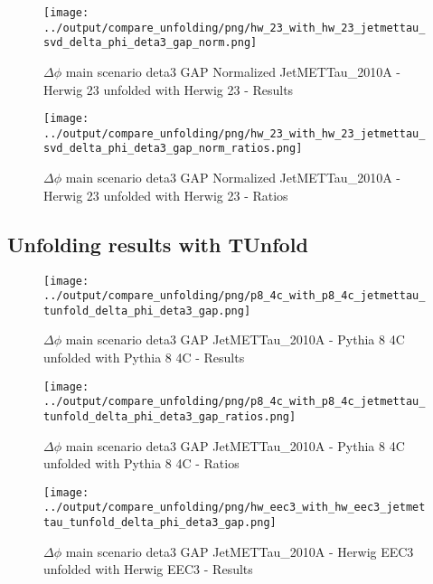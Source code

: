 \documentclass[11pt]{book}
\begin{document}
\begin{figure}[ht]
\centering
\texttt{[image: ../output/compare\_unfolding/png/hw\_23\_with\_hw\_23\_jetmettau\_svd\_delta\_phi\_deta3\_gap\_norm.png]}
\caption{$\Delta\phi$ main scenario deta3 GAP Normalized JetMETTau\_2010A - Herwig 23 unfolded with Herwig 23 - Results}
\label{hw_23_hw_23_jetmettau_svd_delta_phi_deta3_gap_norm_a}
\end{figure}

\begin{figure}[ht]
\centering
\texttt{[image: ../output/compare\_unfolding/png/hw\_23\_with\_hw\_23\_jetmettau\_svd\_delta\_phi\_deta3\_gap\_norm\_ratios.png]}
\caption{$\Delta\phi$ main scenario deta3 GAP Normalized JetMETTau\_2010A - Herwig 23 unfolded with Herwig 23 - Ratios}
\label{hw_23_hw_23_jetmettau_svd_delta_phi_deta3_gap_norm_b}
\end{figure}


\clearpage
\subsection{Unfolding results with TUnfold}

\begin{figure}[ht]
\centering
\texttt{[image: ../output/compare\_unfolding/png/p8\_4c\_with\_p8\_4c\_jetmettau\_tunfold\_delta\_phi\_deta3\_gap.png]}
\caption{$\Delta\phi$ main scenario deta3 GAP JetMETTau\_2010A - Pythia 8 4C unfolded with Pythia 8 4C - Results}
\label{p8_p8_jetmettau_tunfold_delta_phi_deta3_gap_a}
\end{figure}

\begin{figure}[ht]
\centering
\texttt{[image: ../output/compare\_unfolding/png/p8\_4c\_with\_p8\_4c\_jetmettau\_tunfold\_delta\_phi\_deta3\_gap\_ratios.png]}
\caption{$\Delta\phi$ main scenario deta3 GAP JetMETTau\_2010A - Pythia 8 4C unfolded with Pythia 8 4C - Ratios}
\label{p8_p8_jetmettau_tunfold_delta_phi_deta3_gap_b}
\end{figure}

\begin{figure}[ht]
\centering
\texttt{[image: ../output/compare\_unfolding/png/hw\_eec3\_with\_hw\_eec3\_jetmettau\_tunfold\_delta\_phi\_deta3\_gap.png]}
\caption{$\Delta\phi$ main scenario deta3 GAP JetMETTau\_2010A - Herwig EEC3 unfolded with Herwig EEC3 - Results}
\label{hw_eec3_hw_eec3_jetmettau_tunfold_delta_phi_deta3_gap_a}
\end{figure}
\end{document}
